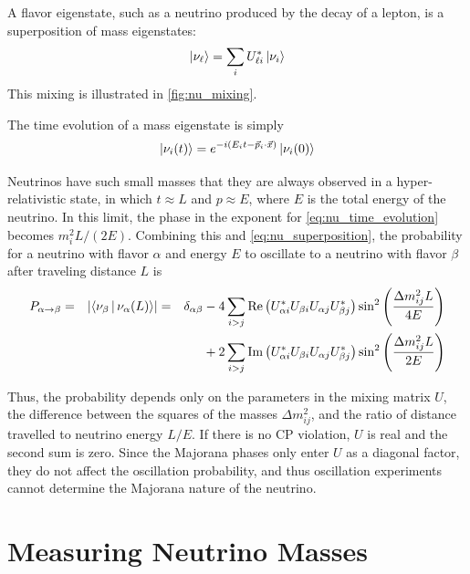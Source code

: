 \documentclass[herrin-thesis.tex]{subfiles}
\begin{document}
 A flavor eigenstate, such as a neutrino produced by the decay of a lepton, is a superposition of mass eigenstates:
 \begin{equation}
 \Ket{\nu_{\ell}} = \sum_{i}U_{\ell i}^{*} \Ket{\nu_i}
 \label{eq:nu_superposition}
 \end{equation}
 This mixing is illustrated in \cref{fig:nu_mixing}.
 
 The time evolution of a mass eigenstate is simply
 \begin{equation}
 \Ket{\nu_{i}(t)} = e^{-i(E_i t - \vec{p}_i\cdot\vec{x})}\Ket{\nu_i(0)}
 \label{eq:nu_time_evolution}
 \end{equation}

Neutrinos have such small masses that they are always observed in a hyper-relativistic state, in which \(t\approx L\) and \(p\approx E\), where \(E\) is the total energy of the neutrino. In this limit, the phase in the exponent for \cref{eq:nu_time_evolution} becomes \(m_i^2 L/(2E)\). Combining this and \cref{eq:nu_superposition}, the probability for a neutrino with flavor \(\alpha\) and energy \(E\) to oscillate to a neutrino with flavor \(\beta\) after traveling distance \(L\) is
\begin{align}
P_{\alpha\rightarrow\beta}	&=& \left | \Braket{\nu_\beta | \nu_\alpha(L)} \right |	& =& \delta_{\alpha\beta}	& - 4\sum_{i>j}\text{Re}\left(U_{\alpha i}^{*}U_{\beta i}U_{\alpha j}U_{\beta j}^{*}\right)\sin^2\left(\frac{\Delta m_{ij}^2 L}{4 E}\right)\nonumber\\
						&  &										&   &					& +2\sum_{i>j}\text{Im}\left(U_{\alpha i}^{*}U_{\beta i}U_{\alpha j}U_{\beta j}^{*}\right)\sin^2\left(\frac{\Delta m_{ij}^2 L}{2 E}\right)
\label{eq:nu_oscillation_prob}
\end{align}

Thus, the probability depends only on the parameters in the mixing matrix \(U\), the difference between the squares of the masses \(\Delta m_{ij}^2\), and the ratio of distance travelled to neutrino energy \(L/E\). If there is no CP violation, \(U\) is real and the second sum is zero. Since the Majorana phases only enter \(U\) as a diagonal factor, they do not affect the oscillation probability, and thus oscillation experiments cannot determine the Majorana nature of the neutrino.

\section{Measuring Neutrino Masses}
\end{document}
